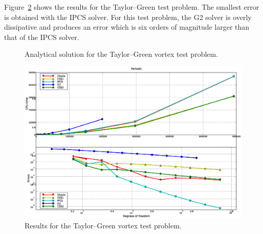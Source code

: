 Figure~\ref{fig:periodic_res} shows the results for the Taylor--Green
test problem. The smallest error is obtained with the IPCS solver. For
this test problem, the G2 solver is overly dissipative and produces an
error which is six orders of magnitude larger than that of the IPCS
solver.

\begin{figure}
  \begin{center}
    \caption{Analytical solution for the Taylor--Green vortex test problem.}
    \label{fig:periodic}
  \end{center}
\end{figure}

\begin{figure}
  \begin{center}
    \includegraphics[width=14cm]{chapters/kvs-1/eps/new_periodic_res.eps}
    \caption{Results for the Taylor--Green vortex test problem.}
    \label{fig:periodic_res}
  \end{center}
\end{figure}

